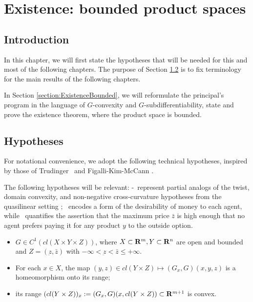 \chapter{Existence: bounded product spaces}\label{chapter:existence_bounded}

\section{Introduction}


	In this chapter, we will first state the hypotheses that will be needed for this and most of the following chapters. The purpose of Section \ref{section:Hypotheses} is to fix terminology for the main results of the following chapters.\medskip
	
	In Section \ref{section:ExistenceBounded}, we will reformulate the principal's program in the language of $G$-convexity and $G$-subdifferentiability, state and prove the existence theorem, where the product space is bounded.  \medskip



\section{Hypotheses}\label{section:Hypotheses}

For notational convenience, we adopt the following technical hypotheses, inspired by those of 
Trudinger~\cite{Trudinger14} and Figalli-Kim-McCann \cite{FigalliKimMcCann11}. \medskip

The following hypotheses will be relevant:  \Gone-\Gthree\ represent partial analogs of the twist, domain convexity,
and non-negative cross-curvature hypotheses from the quasilinear setting \cite{FigalliKimMcCann11} \cite{Loeper09};
\Gfour\ encodes a form of the desirability of money to each agent, while \Gfive\ quantifies the assertion that the maximum
price $\bar z$ is high enough that no agent prefers paying it for any product $y$ to the outside option.\medskip

\begin{itemize}
	\item[\Gzero] $G \in C^{1}(cl(X\times Y \times Z))$, where $X\subset {\mathbf R}^m, Y \subset {\mathbf R}^n$ are open and bounded and $Z=(\underbar z,\bar z)$ with $-\infty <\underbar z < \bar z \le +\infty$.
	
	\item[\Gone] For each $x \in X$, the map $(y,z) \in cl( Y \times Z) \longmapsto (G_x, G)(x,y,z)$ is a homeomorphism onto its range;
	
	\item[\Gtwo] its range $(cl( Y \times Z))_x := (G_x,G)(x,cl(Y \times Z)) \subset {\mathbf R}^{m+1}$ is convex.
\end{itemize}

